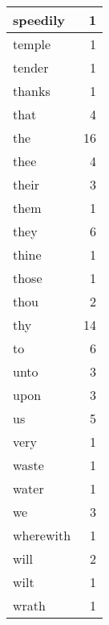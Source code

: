 \begin{center}
\begin{longtable}{l|r}
speedily & 1 \\ \hline
temple & 1 \\ \hline
tender & 1 \\ \hline
thanks & 1 \\ \hline
that & 4 \\ \hline
the & 16 \\ \hline
thee & 4 \\ \hline
their & 3 \\ \hline
them & 1 \\ \hline
they & 6 \\ \hline
thine & 1 \\ \hline
those & 1 \\ \hline
thou & 2 \\ \hline
thy & 14 \\ \hline
to & 6 \\ \hline
unto & 3 \\ \hline
upon & 3 \\ \hline
us & 5 \\ \hline
very & 1 \\ \hline
waste & 1 \\ \hline
water & 1 \\ \hline
we & 3 \\ \hline
wherewith & 1 \\ \hline
will & 2 \\ \hline
wilt & 1 \\ \hline
wrath & 1 \\ \hline
\end{longtable}
\end{center}



\normalsize



